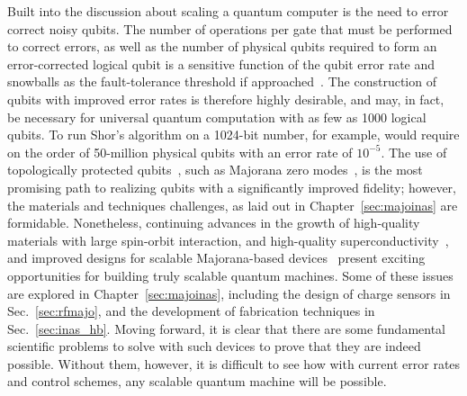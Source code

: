Built into the discussion about scaling a quantum computer is the need to error correct noisy qubits. The number of operations per gate that must be performed to correct errors,
as well as the number of physical qubits required to form an error-corrected logical qubit is a sensitive function of the qubit error rate and snowballs as the fault-tolerance
threshold if approached~\cite{6657074,nature23460}. The construction of qubits with improved error rates is therefore highly desirable, and may, in fact, be necessary for universal
quantum computation with as few as 1000 logical qubits. To run Shor's algorithm on a 1024-bit number, for example, would require on the order of 50-million physical qubits with
an error rate of $10^{-5}$. The use of topologically protected qubits~\cite{RevModPhys.80.1083}, such as Majorana zero modes~\cite{s41578-018-0003-1}, is the most promising path
to realizing qubits with a significantly improved fidelity; however, the materials and techniques challenges, as laid out in Chapter~\ref{sec:majoinas} are formidable.
Nonetheless, continuing advances in the growth of high-quality materials with large spin-orbit interaction, and high-quality superconductivity~\cite{PhysRevLett.119.136803},
and improved designs for scalable Majorana-based devices~\cite{PhysRevB.95.235305,Plugge} present exciting opportunities for building truly scalable quantum machines.
Some of these issues are explored in Chapter~\ref{sec:majoinas}, including the design of charge sensors in Sec.~\ref{sec:rfmajo}, and the development of fabrication techniques
in Sec.~\ref{sec:inas_hb}. Moving forward, it is clear that there are some fundamental scientific problems to solve with such devices to prove that they are indeed possible.
Without them, however, it is difficult to see how with current error rates and control schemes, any scalable quantum machine will be possible.


